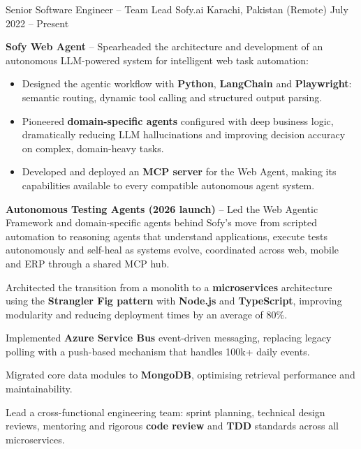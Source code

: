 
\begin{cventries}
  \cventry
    {Senior Software Engineer – Team Lead}
    {Sofy.ai}
    {Karachi, Pakistan (Remote)}
    {July 2022 – Present}
    {
    \begin{cvitems}
      \item {\textbf{Sofy Web Agent} – Spearheaded the architecture and development of an autonomous LLM-powered system for intelligent web task automation:}
        \begin{itemize}
          \item {Designed the agentic workflow with \textbf{Python}, \textbf{LangChain} and \textbf{Playwright}: semantic routing, dynamic tool calling and structured output parsing.}
          \item {Pioneered \textbf{domain-specific agents} configured with deep business logic, dramatically reducing LLM hallucinations and improving decision accuracy on complex, domain-heavy tasks.}
          \item {Developed and deployed an \textbf{MCP server} for the Web Agent, making its capabilities available to every compatible autonomous agent system.}
        \end{itemize}
      \item {\textbf{Autonomous Testing Agents (2026 launch)} – Led the Web Agentic Framework and domain-specific agents behind Sofy's move from scripted automation to reasoning agents that understand applications, execute tests autonomously and self-heal as systems evolve, coordinated across web, mobile and ERP through a shared MCP hub.}
      \item {Architected the transition from a monolith to a \textbf{microservices} architecture using the \textbf{Strangler Fig pattern} with \textbf{Node.js} and \textbf{TypeScript}, improving modularity and reducing deployment times by an average of 80\%.}
      \item {Implemented \textbf{Azure Service Bus} event-driven messaging, replacing legacy polling with a push-based mechanism that handles 100k+ daily events.}
      \item {Migrated core data modules to \textbf{MongoDB}, optimising retrieval performance and maintainability.}
      \item {Lead a cross-functional engineering team: sprint planning, technical design reviews, mentoring and rigorous \textbf{code review} and \textbf{TDD} standards across all microservices.}
    \end{cvitems}
    }


\end{cventries}
